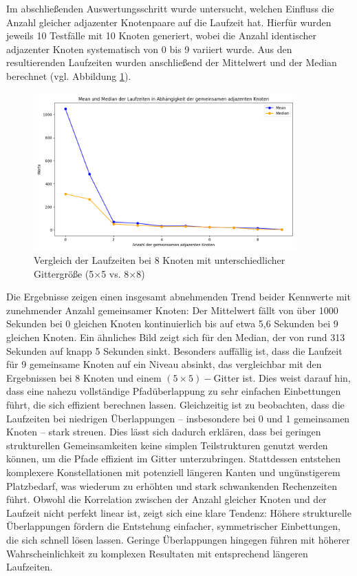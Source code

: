 \documentclass[bachelor, german]{algothesis}
\begin{document}
Im abschließenden Auswertungsschritt wurde untersucht, welchen Einfluss die Anzahl gleicher adjazenter Knotenpaare auf die Laufzeit hat. Hierfür wurden jeweils 10 Testfälle mit 10 Knoten generiert, wobei die Anzahl identischer adjazenter Knoten systematisch von 0 bis 9 variiert wurde. Aus den resultierenden Laufzeiten wurden anschließend der Mittelwert und der Median berechnet (vgl. Abbildung \ref{fig:Sim}).
\begin{figure}[H]
    \centering
    \includegraphics[width=0.9\textwidth]{figures/SimMeanMedian.png}
    \caption{Vergleich der Laufzeiten bei 8 Knoten mit unterschiedlicher Gittergröße (5$\times$5 vs. 8$\times$8)}
    \label{fig:Sim}
\end{figure}
Die Ergebnisse zeigen einen insgesamt abnehmenden Trend beider Kennwerte mit zunehmender Anzahl gemeinsamer Knoten: Der Mittelwert fällt von über 1000 Sekunden bei 0 gleichen Knoten kontinuierlich bis auf etwa 5,6 Sekunden bei 9 gleichen Knoten. Ein ähnliches Bild zeigt sich für den Median, der von rund 313 Sekunden auf knapp 5 Sekunden sinkt. Besonders auffällig ist, dass die Laufzeit für 9 gemeinsame Knoten auf ein Niveau absinkt, das vergleichbar mit den Ergebnissen bei 8 Knoten und einem $(5\times5)-$Gitter ist. Dies weist darauf hin, dass eine nahezu vollständige Pfadüberlappung zu sehr einfachen Einbettungen führt, die sich effizient berechnen lassen.\newline 
Gleichzeitig ist zu beobachten, dass die Laufzeiten bei niedrigen Überlappungen – insbesondere bei 0 und 1 gemeinsamen Knoten – stark streuen. Dies lässt sich dadurch erklären, dass bei geringen strukturellen Gemeinsamkeiten keine simplen Teilstrukturen genutzt werden können, um die Pfade effizient im Gitter unterzubringen. Stattdessen entstehen komplexere Konstellationen mit potenziell längeren Kanten und ungünstigerem Platzbedarf, was wiederum zu erhöhten und stark schwankenden Rechenzeiten führt.\newline 
Obwohl die Korrelation zwischen der Anzahl gleicher Knoten und der Laufzeit nicht perfekt linear ist, zeigt sich eine klare Tendenz: Höhere strukturelle Überlappungen fördern die Entstehung einfacher, symmetrischer Einbettungen, die sich schnell lösen lassen. Geringe Überlappungen hingegen führen mit höherer Wahrscheinlichkeit zu komplexen Resultaten mit entsprechend längeren Laufzeiten.
\end{document}
